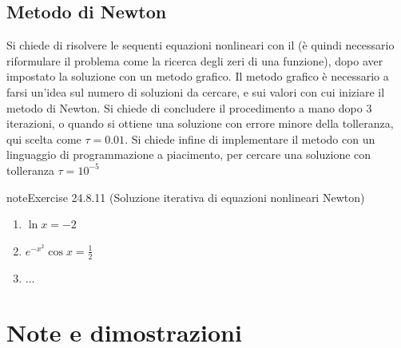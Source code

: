 \documentclass[letterpaper,10pt,italian]{jupyterBook}
\begin{document}
\subsection{Metodo di Newton}
\label{\detokenize{ch/infinitesimal_calculus/derivatives-problems:metodo-di-newton}}\label{\detokenize{ch/infinitesimal_calculus/derivatives-problems:infinitesimal-calculus-derivatives-problems-newton}}
\sphinxAtStartPar
Si chiede di risolvere le sequenti equazioni nonlineari con il {\hyperref[\detokenize{ch/infinitesimal_calculus/derivatives:infinitesimal-calculus-derivatives-applications-newton}]{}} (è quindi necessario riformulare il problema come la ricerca degli zeri di una funzione), dopo aver impostato la soluzione con un metodo grafico. Il metodo grafico è necessario a farsi un’idea sul numero di soluzioni da cercare, e sui valori con cui iniziare il metodo di Newton. Si chiede di concludere il procedimento a mano dopo 3 iterazioni, o quando si ottiene una soluzione con errore minore della tolleranza, qui scelta come \(\tau = 0.01\). Si chiede infine di implementare il metodo con un linguaggio di programmazione a piacimento, per cercare una soluzione con tolleranza \(\tau = 10^{-5}\)
 \label{exercise:ch/infinitesimal_calculus/derivatives-problems-exercise-10}

\begin{sphinxadmonition}{note}{Exercise 24.8.11 (Soluzione iterativa di equazioni nonlineari \sphinxhyphen{} Newton)}


\begin{enumerate}
%
\item {} 
\sphinxAtStartPar
\(\ln x = - 2\)

\item {} 
\sphinxAtStartPar
\(e^{-x^2} \cos x = \frac{1}{2}\)

\item {} 
\sphinxAtStartPar
\(\dots\)

\end{enumerate}
\end{sphinxadmonition}

\sphinxstepscope


\section{Note e dimostrazioni}
\label{\detokenize{ch/infinitesimal_calculus/derivatives-notes:note-e-dimostrazioni}}\label{\detokenize{ch/infinitesimal_calculus/derivatives-notes:infinitesimal-calculus-derivatives-notes}}\label{\detokenize{ch/infinitesimal_calculus/derivatives-notes::doc}}
\end{document}
